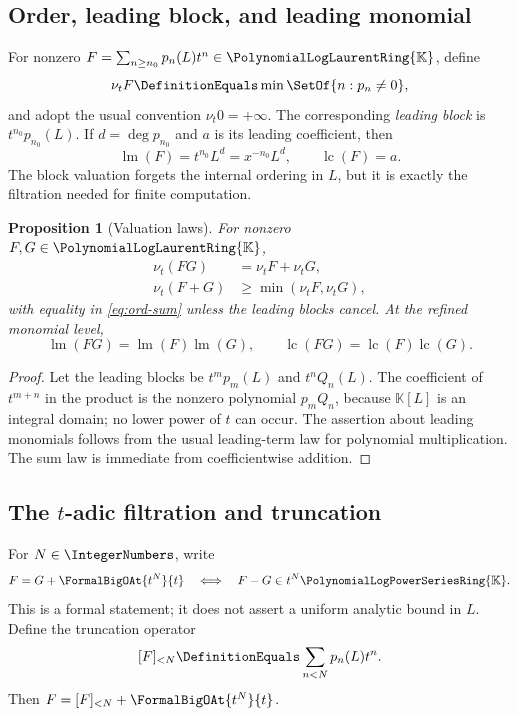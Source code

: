 \documentclass[11pt]{article}
\theoremstyle{pltheorem}
\newtheorem{proposition}[theorem]{Proposition}
\newcommand{\K}{\mathbb K}
\newcommand{\PL}{\PolynomialLogPowerSeriesRing{\K}}
\newcommand{\PLL}{\PolynomialLogLaurentRing{\K}}
\newcommand{\ordt}{\nu_t}
\newcommand{\lm}{\operatorname{lm}}
\newcommand{\lc}{\operatorname{lc}}
\begin{document}
\subsection{Order, leading block, and leading monomial}

For nonzero \(F=\sum_{n\ge n_0}p_n(L)t^n\in\PLL\), define
\begin{equation}\label{eq:t-order}
 \ordt F\DefinitionEquals\min\SetOf{n:p_n\ne0},
\end{equation}
and adopt the usual convention \(\ordt 0=+\infty\).
The corresponding \emph{leading block} is \(t^{n_0}p_{n_0}(L)\).  If
\(d=\deg p_{n_0}\) and \(a\) is its leading coefficient, then
\begin{equation}\label{eq:leading-monomial}
 \lm(F)=t^{n_0}L^d=x^{-n_0}L^d,
 \qquad
 \lc(F)=a.
\end{equation}
The block valuation forgets the internal ordering in \(L\), but it is exactly the filtration needed for finite computation.

\begin{proposition}[Valuation laws]\label{prop:valuation-laws}
For nonzero \(F,G\in\PLL\),
\begin{align}
 \ordt(FG)&=\ordt F+\ordt G,\label{eq:ord-product}\\
 \ordt(F+G)&\ge\min(\ordt F,\ordt G),\label{eq:ord-sum}
\end{align}
with equality in \cref{eq:ord-sum} unless the leading blocks cancel.  At the refined monomial level,
\[
 \lm(FG)=\lm(F)\lm(G),\qquad \lc(FG)=\lc(F)\lc(G).
\]
\end{proposition}

\begin{proof}
Let the leading blocks be \(t^mp_m(L)\) and \(t^nQ_n(L)\).  The coefficient of \(t^{m+n}\) in the product is the nonzero polynomial \(p_mQ_n\), because \(\K[L]\) is an integral domain; no lower power of \(t\) can occur.  The assertion about leading monomials follows from the usual leading-term law for polynomial multiplication.  The sum law is immediate from coefficientwise addition.
\end{proof}

\subsection{\texorpdfstring{The \(t\)-adic filtration and truncation}{The t-adic filtration and truncation}}

For \(N\in\IntegerNumbers\), write
\begin{equation}\label{eq:formal-big-O}
 F=G+\FormalBigOAt{t^N}{t}
 \quad\Longleftrightarrow\quad
 F-G\in t^N\PL.
\end{equation}
This is a formal statement; it does not assert a uniform analytic bound in \(L\).  Define the truncation operator
\begin{equation}\label{eq:truncation}
 [F]_{<N}\DefinitionEquals\sum_{n<N}p_n(L)t^n.
\end{equation}
Then \(F=[F]_{<N}+\FormalBigOAt{t^N}{t}\).
\end{document}
